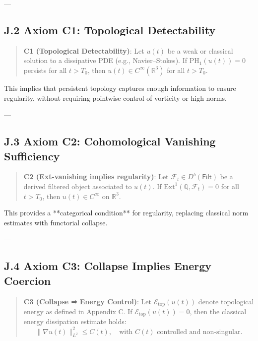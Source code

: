 ---

\subsection*{J.2 Axiom C1: Topological Detectability}

\begin{quote}
\textbf{C1 (Topological Detectability)}:  
Let \( u(t) \) be a weak or classical solution to a dissipative PDE (e.g., Navier–Stokes).  
If \( \mathrm{PH}_1(u(t)) = 0 \) persists for all \( t > T_0 \), then \( u(t) \in C^\infty(\mathbb{R}^3) \) for all \( t > T_0 \).
\end{quote}

This implies that persistent topology captures enough information to ensure regularity,  
without requiring pointwise control of vorticity or high norms.

---

\subsection*{J.3 Axiom C2: Cohomological Vanishing Sufficiency}

\begin{quote}
\textbf{C2 (Ext-vanishing implies regularity)}:  
Let \( \mathcal{F}_t \in D^b(\mathsf{Filt}) \) be a derived filtered object associated to \( u(t) \).  
If \( \mathrm{Ext}^1(\mathbb{Q}, \mathcal{F}_t) = 0 \) for all \( t > T_0 \),  
then \( u(t) \in C^\infty \) on \( \mathbb{R}^3 \).
\end{quote}

This provides a **categorical condition** for regularity, replacing classical norm estimates with functorial collapse.

---

\subsection*{J.4 Axiom C3: Collapse Implies Energy Coercion}

\begin{quote}
\textbf{C3 (Collapse ⇒ Energy Control)}:  
Let \( \mathcal{E}_{\text{top}}(u(t)) \) denote topological energy as defined in Appendix C.  
If \( \mathcal{E}_{\text{top}}(u(t)) = 0 \), then the classical energy dissipation estimate holds:
\[
\|\nabla u(t)\|_{L^2}^2 \leq C(t), \quad \text{with } C(t) \text{ controlled and non-singular}.
\]
\end{quote}

